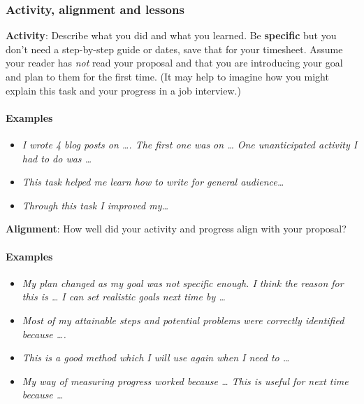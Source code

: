 \documentclass[
  openany]{book}
\providecommand{\tightlist}{%
  \setlength{\itemsep}{0pt}\setlength{\parskip}{0pt}}
\begin{document}
\hypertarget{activity-alignment-and-lessons}{%
\subsubsection{Activity, alignment and lessons}\label{activity-alignment-and-lessons}}

\textbf{Activity}: Describe what you did and what you learned. Be \textbf{specific} but you don't need a step-by-step guide or dates, save that for your timesheet. Assume your reader has \emph{not} read your proposal and that you are introducing your goal and plan to them for the first time. (It may help to imagine how you might explain this task and your progress in a job interview.)

\hypertarget{examples-1}{%
\paragraph{Examples}\label{examples-1}}

\begin{itemize}
\tightlist
\item
  \emph{I wrote 4 blog posts on \ldots. The first one was on \ldots{} One unanticipated activity I had to do was \ldots{}}\\
\item
  \emph{This task helped me learn how to write for general audience\ldots{}}\\
\item
  \emph{Through this task I improved my\ldots{}}
\end{itemize}

\textbf{Alignment}: How well did your activity and progress align with your proposal?

\hypertarget{examples-2}{%
\paragraph{Examples}\label{examples-2}}

\begin{itemize}
\tightlist
\item
  \emph{My plan changed as my goal was not specific enough. I think the reason for this is \ldots{} I can set realistic goals next time by \ldots{}}\\
\item
  \emph{Most of my attainable steps and potential problems were correctly identified because \ldots.}\\
\item
  \emph{This is a good method which I will use again when I need to \ldots{}}\\
\item
  \emph{My way of measuring progress worked because \ldots{} This is useful for next time because \ldots{}}
\end{itemize}
\end{document}

